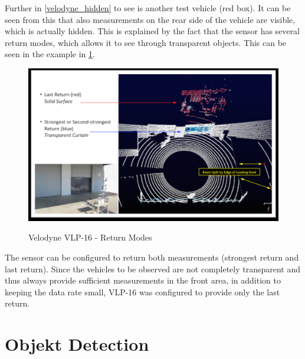 \documentclass[11pt,oneside,openright]{mpreport}
\begin{document}
Further in \cref{velodyne_hidden} to see is another test vehicle (red box). It can be seen from this that also measurements on the rear side of the vehicle are visible, 
which is actually hidden. This is explained by the fact that the sensor has several return modes, which allows it to see through transparent objects. 
This can be seen in the example in \cref{vel_trans}.

\begin{figure}[!ht]
\caption{Velodyne VLP-16 - Return Modes \cite{manVEL}}
\includegraphics[width=\textwidth]{bilder/velodyne_trans.png}
\label{vel_trans}
\end{figure}


The sensor can be configured to return both measurements (strongest return and last return). Since the vehicles to be observed are not completely transparent and thus 
always provide sufficient measurements in the front area, in addition to keeping the data rate small, VLP-16 was configured to provide only the last return.



\chapter{Objekt Detection}
\end{document}
